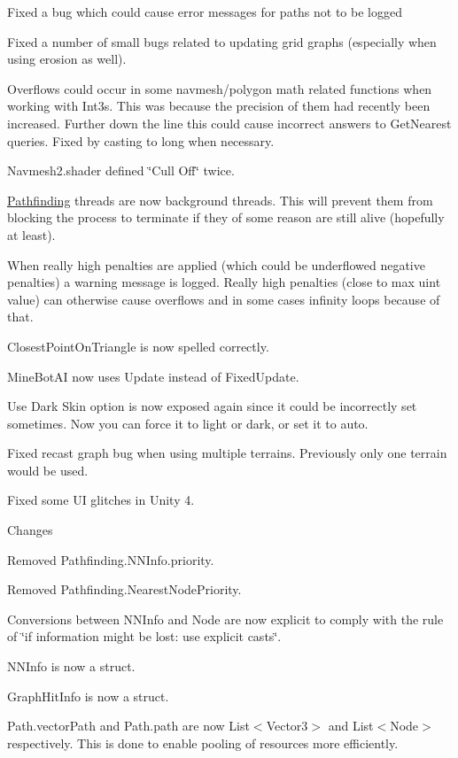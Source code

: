 \begin{DoxyItemize}
\begin{DoxyItemize}
\begin{DoxyItemize}
\item Fixed a bug which could cause error messages for paths not to be logged
\item Fixed a number of small bugs related to updating grid graphs (especially when using erosion as well).
\item Overflows could occur in some navmesh/polygon math related functions when working with Int3s. This was because the precision of them had recently been increased. Further down the line this could cause incorrect answers to Get\+Nearest queries. Fixed by casting to long when necessary.
\item Navmesh2.\+shader defined \char`\"{}\+Cull Off\char`\"{} twice.
\item \mbox{\hyperlink{namespace_pathfinding}{Pathfinding}} threads are now background threads. This will prevent them from blocking the process to terminate if they of some reason are still alive (hopefully at least).
\item When really high penalties are applied (which could be underflowed negative penalties) a warning message is logged. Really high penalties (close to max uint value) can otherwise cause overflows and in some cases infinity loops because of that.
\item Closest\+Point\+On\+Triangle is now spelled correctly.
\item Mine\+Bot\+AI now uses Update instead of Fixed\+Update.
\item Use Dark Skin option is now exposed again since it could be incorrectly set sometimes. Now you can force it to light or dark, or set it to auto.
\item Fixed recast graph bug when using multiple terrains. Previously only one terrain would be used.
\item Fixed some UI glitches in Unity 4.
\end{DoxyItemize}
\item Changes
\begin{DoxyItemize}
\item Removed Pathfinding.\+N\+N\+Info.\+priority.
\item Removed Pathfinding.\+Nearest\+Node\+Priority.
\item Conversions between N\+N\+Info and Node are now explicit to comply with the rule of \char`\"{}if information might be lost\+: use explicit casts\char`\"{}.
\item N\+N\+Info is now a struct.
\item Graph\+Hit\+Info is now a struct.
\item Path.\+vector\+Path and Path.\+path are now List$<$\+Vector3$>$ and List$<$\+Node$>$ respectively. This is done to enable pooling of resources more efficiently.

\end{DoxyItemize}
\end{DoxyItemize}
\end{DoxyItemize}
